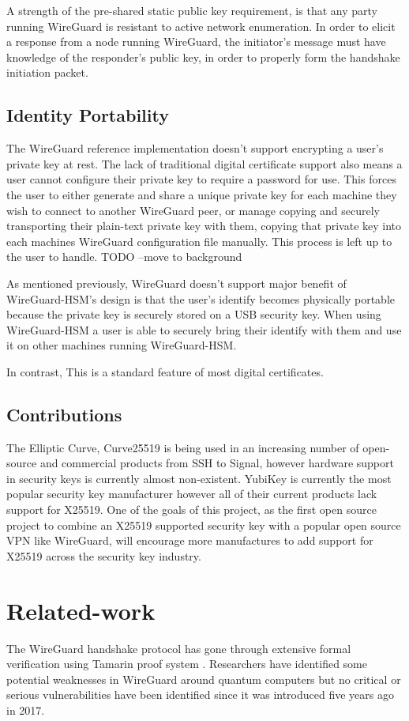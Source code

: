 \documentclass [11pt, proquest] {uwthesis}[2020/02/24]
\begin{document}
A strength of the pre-shared static public key requirement, is that any party running WireGuard is resistant to active network enumeration. In order to elicit a response from a node running WireGuard, the initiator's message must have knowledge of the responder's public key, in order to properly form the handshake initiation packet.

\section {Identity Portability}
The WireGuard reference implementation doesn't support encrypting a user's private key at rest. The lack of traditional digital certificate support also means a user cannot configure their private key to require a password for use. This forces the user to either generate and share a unique private key for each machine they wish to connect to another WireGuard peer, or manage copying and securely transporting their plain-text private key with them, copying that private key into each machines WireGuard configuration file manually. This process is left up to the user to handle. TODO --move to background

As mentioned previously, WireGuard doesn't support major benefit of WireGuard-HSM's design is that the user's identify becomes physically portable because the private key is securely stored on a USB security key. When using WireGuard-HSM a user is able to securely bring their identify with them and use it on other machines running WireGuard-HSM. 

In contrast, This is a standard feature of most digital certificates.


\section {Contributions}
The Elliptic Curve, Curve25519 is being used in an increasing number of open-source and commercial products\cite{noauthor_things_nodate-1} from SSH to Signal, however hardware support in 
security keys is currently almost non-existent. YubiKey is currently the most popular security key manufacturer however all of their current products 
lack support for X25519. One of the goals of this project, as the first open source project to combine an X25519 supported security key with a popular open source VPN like WireGuard, will encourage more manufactures to add support for X25519 across the security key industry.

\chapter {Related-work}
\label{related_work}
The WireGuard handshake protocol has gone through extensive formal verification using Tamarin proof system \cite{donenfeld_formal_2018}. Researchers have identified some potential weaknesses in WireGuard around quantum computers\cite{hulsing_post-quantum_2021} but no critical or serious vulnerabilities have been identified since it was introduced five years ago in 2017.
\end{document}
